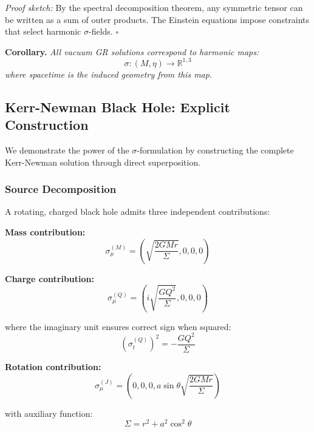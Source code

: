 \documentclass[11pt,a4paper]{article}
\theoremstyle{definition}
\theoremstyle{remark}
\begin{document}
	\emph{Proof sketch:} By the spectral decomposition theorem, any symmetric tensor can be written as a sum of outer products. The Einstein equations impose constraints that select harmonic $\sigma$-fields. $\square$
	
	\textbf{Corollary.} \emph{All vacuum GR solutions correspond to harmonic maps:}
	\begin{equation}
		\sigma: (M, \eta) \to \mathbb{R}^{1,3}
	\end{equation}
	\emph{where spacetime is the induced geometry from this map.}
	
	\subsection{Kerr-Newman Black Hole: Explicit Construction}
	
	We demonstrate the power of the $\sigma$-formulation by constructing the complete Kerr-Newman solution through direct superposition.
	
	\subsubsection{Source Decomposition}
	
	A rotating, charged black hole admits three independent contributions:
	
	\textbf{Mass contribution:}
	\begin{equation}
		\sigma_\mu^{(M)} = \left(\sqrt{\frac{2GMr}{\Sigma}}, 0, 0, 0\right)
	\end{equation}
	
	\textbf{Charge contribution:}
	\begin{equation}
		\sigma_\mu^{(Q)} = \left(i\sqrt{\frac{GQ^2}{\Sigma}}, 0, 0, 0\right)
	\end{equation}
	
	where the imaginary unit ensures correct sign when squared:
	\begin{equation}
		(\sigma_t^{(Q)})^2 = -\frac{GQ^2}{\Sigma}
	\end{equation}
	
	\textbf{Rotation contribution:}
	\begin{equation}
		\sigma_\mu^{(J)} = \left(0, 0, 0, a\sin\theta\sqrt{\frac{2GMr}{\Sigma}}\right)
	\end{equation}
	
	with auxiliary function:
	\begin{equation}
		\Sigma = r^2 + a^2\cos^2\theta
	\end{equation}
	
\end{document}
